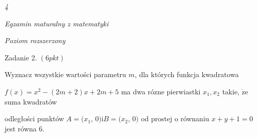 \documentclass[a4paper,12pt]{article}
\begin{document}
{\it 4}

{\it Egzamin maturalny z matematyki}

{\it Poziom rozszerzony}

Zadanie 2. $(6pkt)$

Wyznacz wszystkie wartości parametru $m$, dla których funkcja kwadratowa

$f(x)=x^{2}-(2m+2)x+2m+5$ ma dwa rózne pierwiastki $x_{1}, x_{2}$ takie, $\dot{\mathrm{z}}\mathrm{e}$ suma kwadratów

odległości punktów $A=(x_{1}$, 0$) \mathrm{i}B=(x_{2}$, 0$)$ od prostej o równaniu $x+y+1=0$ jest równa 6.
\end{document}
